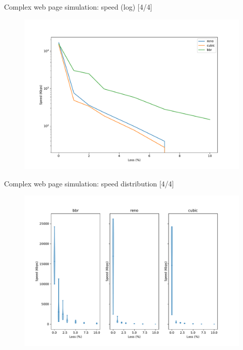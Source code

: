 \documentclass[13pt,aspectratio=43]{beamer}
\begin{document}
\begin{frame}{Complex web page simulation: speed (log) [4/4]}
  \begin{figure}
	  \includegraphics[width=\textwidth,height=\textheight,keepaspectratio]{../http_test/plot_log.pdf}
  \end{figure}
\end{frame}

\begin{frame}{Complex web page simulation: speed distribution [4/4]}
  \begin{figure}
	  \includegraphics[width=\textwidth,height=\textheight,keepaspectratio]{../http_test/violinplot.pdf}
  \end{figure}
\end{frame}
\end{document}
